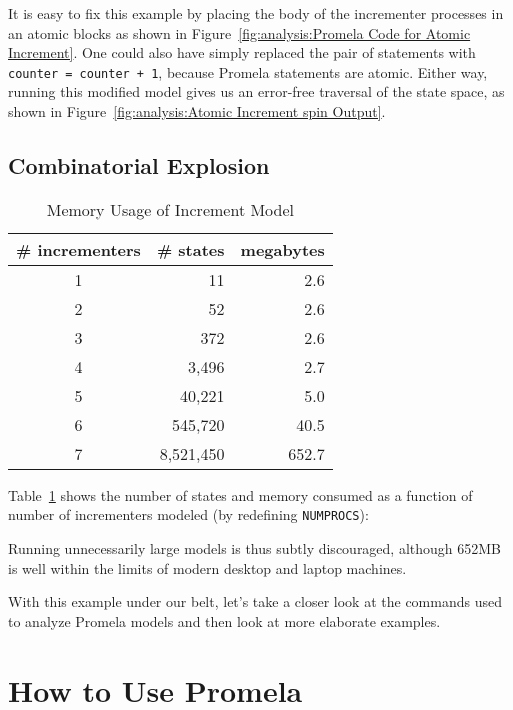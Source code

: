It is easy to fix this example by placing the body of the incrementer
processes in an atomic blocks as shown in
Figure~\ref{fig:analysis:Promela Code for Atomic Increment}.
One could also have simply replaced the pair of statements with
{\tt counter = counter + 1}, because Promela statements are
atomic.
Either way, running this modified model gives us an error-free traversal
of the state space, as shown in
Figure~\ref{fig:analysis:Atomic Increment spin Output}.

\subsection{Combinatorial Explosion}
\label{app:formal:Combinatorial Explosion}

\begin{table}
\begin{center}
\begin{tabular}{c|r|r}
	\# incrementers & \# states &	megabytes \\
	\hline
	\hline
	1 &		        11 &          2.6 \\
	\hline
	2 &		        52 &          2.6 \\
	\hline
	3 &		       372 &          2.6 \\
	\hline
	4 &		     3,496 &          2.7 \\
	\hline
	5 &		    40,221 &          5.0 \\
	\hline
	6 &		   545,720 &         40.5 \\
	\hline
	7 &		 8,521,450 &        652.7 \\
\end{tabular}
\end{center}
\caption{Memory Usage of Increment Model}
\label{tab:advsync:Memory Usage of Increment Model}
\end{table}

Table~\ref{tab:advsync:Memory Usage of Increment Model}
shows the number of states and memory consumed
as a function of number of incrementers modeled
(by redefining {\tt NUMPROCS}):

Running unnecessarily large models is thus subtly discouraged, although
652MB is well within the limits of modern desktop and laptop machines.

With this example under our belt, let's take a closer look at the
commands used to analyze Promela models and then look at more
elaborate examples.

\section{How to Use Promela}
\label{app:formal:How to Use Promela}

